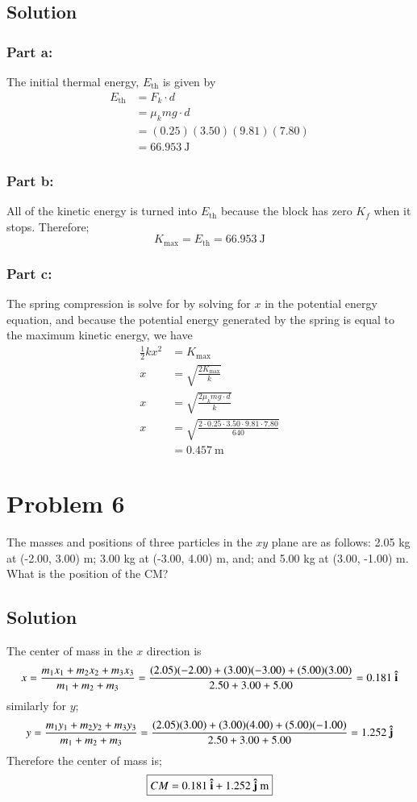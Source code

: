 \documentclass{article}
\newcommand{\Eth}{E_{\text{th}}}
\begin{document}
\subsection*{Solution}
\subsubsection*{Part a:}
The initial thermal energy, $E_{\text{th}}$ is given by
\begin{align*}
	\Eth &= F_k \cdot d \\
	     &= \mu_k mg \cdot d \\
	     &= (0.25)(3.50)(9.81)(7.80) \\
	     &= \boxed{66.953\ \text{J}}
\end{align*}

\subsubsection*{Part b:}
All of the kinetic energy is turned into $\Eth$ because the block has zero $K_f$ when it stops. Therefore;
\[
	K_\text{max} = \Eth = \boxed{66.953\ \text{J}}
\]

\subsubsection*{Part c:}
The spring compression is solve for by solving for $x$ in the potential energy equation, and because the potential energy generated by the spring is equal to the maximum kinetic energy, we have
\begin{align*}
	\frac{1}{2}kx^2 &= K_\text{max} \\
	x &= \sqrt{\frac{2 K_\text{max}}{k}} \\
	x &= \sqrt{\frac{2 \mu_k mg \cdot d}{k}} \\
	x &= \sqrt{\frac{2 \cdot 0.25 \cdot 3.50 \cdot 9.81 \cdot 7.80}{640}} \\
	  &= \boxed{0.457 \ \text{m}}
\end{align*}



\section*{Problem 6}
The masses and positions of three particles in the $xy$ plane are as follows: 2.05 kg at (-2.00, 3.00) m; 3.00 kg
at (-3.00, 4.00) m, and; and 5.00 kg at (3.00, -1.00) m. What is the position of the CM?

\subsection*{Solution}
The center of mass in the $x$ direction is
\[
	x = \frac{m_1 x_1 + m_2 x_2 + m_3 x_3}{m_1 + m_2 + m_3} = \frac{(2.05)(-2.00)+(3.00)(-3.00)+(5.00)(3.00)}{2.50 + 3.00 + 5.00} = 0.181\ \vu i
\]
similarly for $y$;
\[
	y = \frac{m_1 y_1 + m_2 y_2 + m_3 y_3}{m_1 + m_2 + m_3} = \frac{(2.05)(3.00) + (3.00)(4.00) + (5.00)(-1.00)}{2.50 + 3.00 + 5.00} = 1.252\ \vu j
\]
Therefore the center of mass is;
\[
	\boxed{ CM = 0.181\ \vu i + 1.252\ \vu j \ \text{m}}
\]
\end{document}
